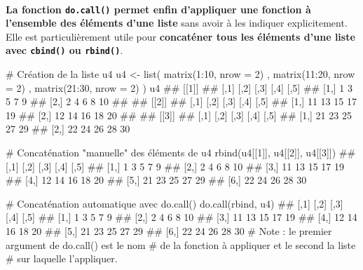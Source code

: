 \documentclass[12pt,twosided, notitlepage]{book}
\newenvironment{Shaded}{}{}
\newcommand{\KeywordTok}[1]{\textcolor[rgb]{0.00,0.00,1.00}{{#1}}}
\newcommand{\DataTypeTok}[1]{{#1}}
\newcommand{\DecValTok}[1]{{#1}}
\newcommand{\StringTok}[1]{\textcolor[rgb]{0.00,0.50,0.50}{{#1}}}
\newcommand{\CommentTok}[1]{\textcolor[rgb]{0.00,0.50,0.00}{{#1}}}
\newcommand{\NormalTok}[1]{{#1}}
\renewenvironment{Shaded}{\begin{snugshade}}{\end{snugshade}}
\begin{document}
~

\textbf{La fonction \texttt{do.call()} permet enfin d'appliquer une
fonction à l'ensemble des éléments d'une
liste} sans avoir à les indiquer
explicitement. Elle est particulièrement utile pour \textbf{concaténer
tous les éléments d'une liste avec \texttt{cbind()} ou
\texttt{rbind()}}.

\begin{Shaded}
\begin{Highlighting}[]
\CommentTok{# Création de la liste u4}
\NormalTok{u4 <-}\StringTok{ }\KeywordTok{list}\NormalTok{(}
  \KeywordTok{matrix}\NormalTok{(}\DecValTok{1}\NormalTok{:}\DecValTok{10}\NormalTok{, }\DataTypeTok{nrow =} \DecValTok{2}\NormalTok{)}
  \NormalTok{, }\KeywordTok{matrix}\NormalTok{(}\DecValTok{11}\NormalTok{:}\DecValTok{20}\NormalTok{, }\DataTypeTok{nrow =} \DecValTok{2}\NormalTok{)}
  \NormalTok{, }\KeywordTok{matrix}\NormalTok{(}\DecValTok{21}\NormalTok{:}\DecValTok{30}\NormalTok{, }\DataTypeTok{nrow =} \DecValTok{2}\NormalTok{)}
\NormalTok{)}
\NormalTok{u4}
  \NormalTok{## [[1]]}
  \NormalTok{##      [,1] [,2] [,3] [,4] [,5]}
  \NormalTok{## [1,]    1    3    5    7    9}
  \NormalTok{## [2,]    2    4    6    8   10}
  \NormalTok{## }
  \NormalTok{## [[2]]}
  \NormalTok{##      [,1] [,2] [,3] [,4] [,5]}
  \NormalTok{## [1,]   11   13   15   17   19}
  \NormalTok{## [2,]   12   14   16   18   20}
  \NormalTok{## }
  \NormalTok{## [[3]]}
  \NormalTok{##      [,1] [,2] [,3] [,4] [,5]}
  \NormalTok{## [1,]   21   23   25   27   29}
  \NormalTok{## [2,]   22   24   26   28   30}

\CommentTok{# Concaténation "manuelle" des éléments de u4}
\KeywordTok{rbind}\NormalTok{(u4[[}\DecValTok{1}\NormalTok{]], u4[[}\DecValTok{2}\NormalTok{]], u4[[}\DecValTok{3}\NormalTok{]])}
  \NormalTok{##      [,1] [,2] [,3] [,4] [,5]}
  \NormalTok{## [1,]    1    3    5    7    9}
  \NormalTok{## [2,]    2    4    6    8   10}
  \NormalTok{## [3,]   11   13   15   17   19}
  \NormalTok{## [4,]   12   14   16   18   20}
  \NormalTok{## [5,]   21   23   25   27   29}
  \NormalTok{## [6,]   22   24   26   28   30}

\CommentTok{# Concaténation automatique avec do.call()}
\KeywordTok{do.call}\NormalTok{(rbind, u4)}
  \NormalTok{##      [,1] [,2] [,3] [,4] [,5]}
  \NormalTok{## [1,]    1    3    5    7    9}
  \NormalTok{## [2,]    2    4    6    8   10}
  \NormalTok{## [3,]   11   13   15   17   19}
  \NormalTok{## [4,]   12   14   16   18   20}
  \NormalTok{## [5,]   21   23   25   27   29}
  \NormalTok{## [6,]   22   24   26   28   30}
\CommentTok{# Note : le premier argument de do.call() est le nom}
\CommentTok{# de la fonction à appliquer et le second la liste}
\CommentTok{# sur laquelle l'appliquer. }
\end{Highlighting}
\end{Shaded}
\end{document}
